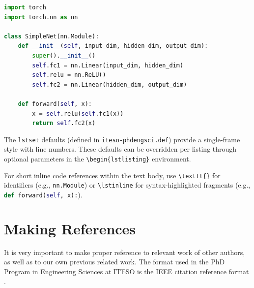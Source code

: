 \documentclass{iteso-irr}
\begin{document}
\begin{lstlisting}[language=Python,
    caption={A simple feedforward neural network in PyTorch.},
    label={lst:pytorch_model}]
import torch
import torch.nn as nn

class SimpleNet(nn.Module):
    def __init__(self, input_dim, hidden_dim, output_dim):
        super().__init__()
        self.fc1 = nn.Linear(input_dim, hidden_dim)
        self.relu = nn.ReLU()
        self.fc2 = nn.Linear(hidden_dim, output_dim)

    def forward(self, x):
        x = self.relu(self.fc1(x))
        return self.fc2(x)
\end{lstlisting}

The \texttt{lstset} defaults (defined in \texttt{iteso-phdengsci.def})
provide a single-frame style with line numbers. These defaults can be
overridden per listing through optional parameters in the
\verb|\begin{lstlisting}| environment.

For short inline code references within the text body, use
\verb|\texttt{}| for identifiers (e.g., \texttt{nn.Module}) or
\verb|\lstinline| for syntax-highlighted fragments (e.g.,
\lstinline[language=Python]{def forward(self, x):}).


\section{Making References}
\label{sec:references}

It is very important to make proper reference to relevant work of other
authors, as well as to our own previous related work. The format used in
the PhD Program in Engineering Sciences at ITESO is the IEEE citation
reference format \cite{ref:ieee_guide}.
\end{document}
